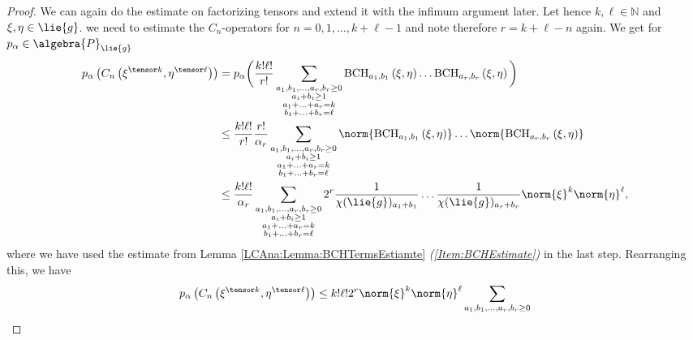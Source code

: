 \begin{proof}
	We can again do the estimate on factorizing tensors and extend it with the 
	infimum argument later. Let hence $k, \ell \in \mathbb{N}$ and 
	$\xi, \eta \in \lie{g}$. we need to estimate the $C_n$-operators for $n = 
	0, 1, \ldots, k + \ell - 1$ and note therefore $r = k + \ell - n$ again.
	We get for $p_{\alpha} \in \algebra{P}_{\lie{g}}$
	\begin{align*}
		p_{\alpha} \left(
			C_n\left( \xi^{\tensor k}, \eta^{\tensor \ell} \right)
		\right)
		& =
		p_{\alpha}
		\bigg(
        		\frac{k! \ell!}{r!}
        		\sum\limits_{\substack{a_1, b_1, \ldots, a_r, b_r \geq 0 \\
            		a_i + b_i \geq 1 \\
            		a_1 + \ldots + a_r = k \\
            		b_1 + \ldots + b_r = \ell
          		}}
        		\bchparts{a_1}{b_1}{\xi}{\eta}
        		\ldots
        		\bchparts{a_r}{b_r}{\xi}{\eta}
        \bigg)
        \\
        & \leq 
    		\frac{k! \ell!}{r!}
    		\frac{r!}{\alpha_r}
    		\sum\limits_{\substack{a_1, b_1, \ldots, a_r, b_r \geq 0 \\
        		a_i + b_i \geq 1 \\
        		a_1 + \ldots + a_r = k \\
        		b_1 + \ldots + b_r = \ell
       	}}
       	\norm{
    			\bchparts{a_1}{b_1}{\xi}{\eta}
    		}
    		\ldots
    		\norm{
    			\bchparts{a_r}{b_r}{\xi}{\eta}
    		}
        \\
        & \leq
    		\frac{k! \ell!}{\alpha_r}
    		\sum\limits_{\substack{a_1, b_1, \ldots, a_r, b_r \geq 0 \\
        		a_i + b_i \geq 1 \\
        		a_1 + \ldots + a_r = k \\
        		b_1 + \ldots + b_r = \ell
       	}}
       	2^r 
       	\frac{1}{\chi(\lie{g})_{a_1 + b_1}}
       	\ldots
       	\frac{1}{\chi(\lie{g})_{a_r + b_r}}
       	\norm{\xi}^k
       	\norm{\eta}^{\ell},
    \end{align*}
	where we have used the estimate from Lemma 
	\ref{LCAna:Lemma:BCHTermsEstiamte} \textit{(\ref{Item:BCHEstimate})}
	in the last step. Rearranging this, we have
	\begin{equation*}
		p_{\alpha} \left(
			C_n\left( \xi^{\tensor k}, \eta^{\tensor \ell} \right)
		\right)
		\leq
    		k! \ell! 2^r
    		\norm{\xi}^k
       	\norm{\eta}^{\ell}
    		\sum\limits_{\substack{a_1, b_1, \ldots, a_r, b_r \geq 0 \\
}}
\end{equation*}
\end{proof}
